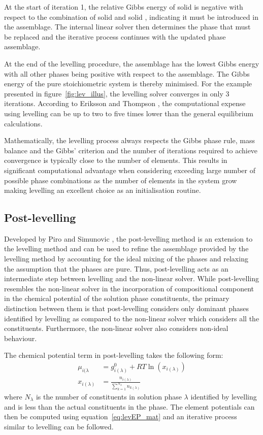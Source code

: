 	At the start of iteration 1, the relative Gibbs energy of solid  is negative with respect to the combination of solid  and solid , indicating it must be introduced in the assemblage. The internal linear solver then determines the phase that must be replaced and the iterative process continues with the updated phase assemblage.

	At the end of the levelling procedure, the assemblage has the lowest Gibbs energy with all other phases being positive with respect to the assemblage. The Gibbs energy of the pure stoichiometric system is thereby minimised. For the example presented in figure~\ref{fig:lev_illus}, the levelling solver converges in only 3 iterations. According to Eriksson and Thompson \cite{Eriksson89}, the computational expense using levelling can be up to two to five times lower than the general equilibrium calculations.

	Mathematically, the levelling  process always respects the Gibbs phase rule, mass balance and the Gibbs' criterion and the number of iterations required to achieve convergence is typically close to the number of elements. This results in significant computational advantage when considering exceeding large number of possible phase combinations as the number of elements in the system grow making levelling an excellent choice as an initialisation routine.

	\subsection{Post-levelling}
	Developed by Piro and Simunovic \cite{Piro12a}, the post-levelling method is an extension to the levelling method and can be used to refine the assemblage provided by the levelling method by accounting for the ideal mixing of the phases and relaxing the assumption that the phases are pure. Thus, post-levelling acts as an intermediate step between levelling and the non-linear solver. While post-levelling resembles the non-linear solver in the incorporation of compositional component in the chemical potential of the solution phase constituents, the primary distinction between them is that post-levelling considers only dominant phases identified by levelling as compared to the non-linear solver which considers all the constituents. Furthermore, the non-linear solver also considers non-ideal behaviour.

		The chemical potential term in post-levelling takes the following form:
		\begin{equation}
			\begin{aligned}
				\mu_{i(\lambda} &= g_{i(\lambda)}^0 + RT \ln{(x_{i(\lambda)})} \\
				x_{i(\lambda)} &= \frac{n_{i(\lambda)}}{\sum_{k=1}^{N_{\lambda}}n_{k(\lambda)}}
			\end{aligned}
		\end{equation}
		where $N_{\lambda}$ is the number of constituents in solution phase $\lambda$ identified by levelling and is less than the actual constituents in the phase. The element potentials can then be computed using equation~\eqref{eq:levEP_mat} and an iterative process similar to levelling can be followed.

